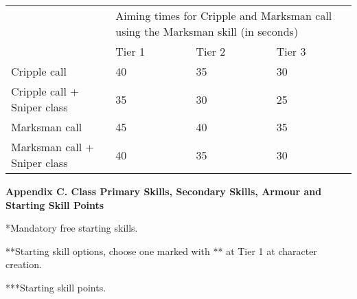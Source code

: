 \documentclass{scrbook}
\begin{document}
\begin{table}
\begin{tabular}{|l|l|l|l|} \hline 
\multirow{1}{*}{}& \multicolumn{3}{|l|}{Aiming times for Cripple and Marksman call using the Marksman skill (in seconds)} \\
\cline{2-2}\cline{3-3}\cline{4-4} & Tier 1 & Tier 2 & Tier 3 \\
 \hline Cripple call & 40 & 35 & 30 \\
 \hline Cripple call + Sniper class & 35 & 30 & 25 \\
 \hline Marksman call & 45 & 40 & 35 \\
 \hline Marksman call + Sniper class & 40 & 35 & 30 \\
 \hline \end{tabular}

\end{table}

\textbf{Appendix C. Class Primary Skills, Secondary Skills, Armour and Starting Skill Points}

*Mandatory free starting skills.

**Starting skill options, choose one marked with ** at Tier 1 at character creation.

***Starting skill points.
\end{document}
